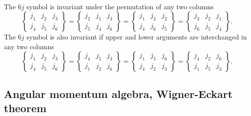 \documentclass[%
twoside,                 %
final,                   %
10pt]{article}
\begin{document}
\paragraph{}
The $6j$ symbol is invariant under the permutation of any two columns
\[
    \begin{Bmatrix} j_1 & j_2 & j_3\\ j_4 & j_5 & j_6 \end{Bmatrix} = \begin{Bmatrix} j_2 & j_1 & j_3\\ j_5 & j_4 & j_6 \end{Bmatrix} = \begin{Bmatrix} j_1 & j_3 & j_2\\ j_4 & j_6 & j_5 \end{Bmatrix} = \begin{Bmatrix} j_3 & j_2 & j_1\\ j_6 & j_5 & j_4 \end{Bmatrix}. 
\]
The $6j$ symbol is also invariant if upper and lower arguments are interchanged in any two columns
\[
    \begin{Bmatrix} j_1 & j_2 & j_3\\ j_4 & j_5 & j_6 \end{Bmatrix} = \begin{Bmatrix} j_4 & j_5 & j_3\\ j_1 & j_2 & j_6 \end{Bmatrix} = \begin{Bmatrix} j_1 & j_5 & j_6\\ j_4 & j_2 & j_3 \end{Bmatrix} = \begin{Bmatrix} j_4 & j_2 & j_6\\ j_1 & j_5 & j_3 \end{Bmatrix}. 
\]



\subsection{Angular momentum algebra, Wigner-Eckart theorem}

\end{document}
